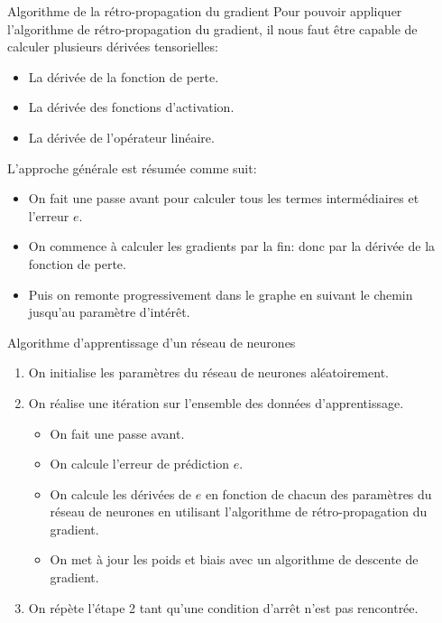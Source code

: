 \begin{frame}{Algorithme de la rétro-propagation du gradient}
	Pour pouvoir appliquer l'algorithme de rétro-propagation du gradient, il nous faut être capable de calculer plusieurs dérivées tensorielles:
	\begin{itemize}
		\item La dérivée de la fonction de perte.
		\item La dérivée des fonctions d'activation.
		\item La dérivée de l'opérateur linéaire.
	\end{itemize}
	\vspace{0.3cm}
	\pause
	L'approche générale est résumée comme suit:
	\begin{itemize}
		\item On fait une passe avant pour calculer tous les termes intermédiaires et l'erreur $e$.
		\pause
		\item On commence à calculer les gradients par la fin: donc par la dérivée de la fonction de perte.
		\pause
		\item Puis on remonte progressivement dans le graphe en suivant le chemin jusqu'au paramètre d'intérêt.
	\end{itemize}
\end{frame}

\begin{frame}{Algorithme d'apprentissage d'un réseau de neurones}
	\begin{enumerate}
		\item On initialise les paramètres du réseau de neurones aléatoirement.
		\pause
		\item On réalise une itération sur l'ensemble des données d'apprentissage.
		\pause
		\begin{itemize}
			\item On fait une passe avant.
			\pause
			\item On calcule l'erreur de prédiction $e$.
			\pause
			\item On calcule les dérivées de $e$ en fonction de chacun des paramètres du réseau de neurones en utilisant l'algorithme de rétro-propagation du gradient.
			\pause
			\item On met à jour les poids et biais avec un algorithme de descente de gradient.
		\end{itemize}
		\pause 
		\item On répète l'étape 2 tant qu'une condition d'arrêt n'est pas rencontrée.
	\end{enumerate}
\end{frame}

